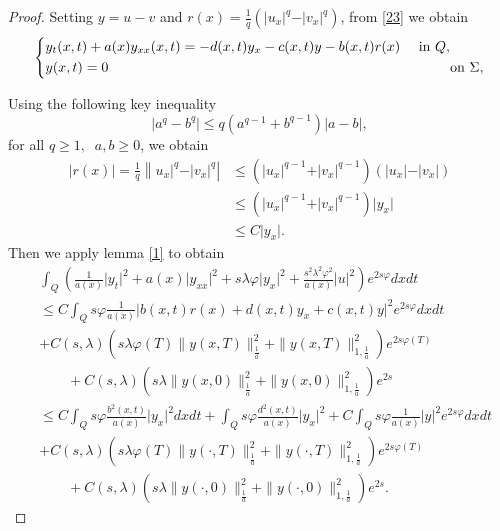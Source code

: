 \documentclass[reqno]{amsart}
\theoremstyle{plain}
\theoremstyle{remark}
\numberwithin{equation}{section}
\begin{document}
\begin{proof}
    Setting $y=u-v$ and $r(x)=\frac{1}{q}(\vert u_{x}\vert^q-\vert v_{x}\vert^q)$, from \eqref{23} we obtain
   \begin{equation}
       \left\{
\begin{aligned}
& y_{t}(x,t) +a(x) y_{xx}(x,t)=-d(x,t)y_{x}-c(x,t)y -b(x,t)r(x)\quad\text{ in } Q,\\
& y(x,t)=0 \hspace{8.5cm}\text{ on } \Sigma,
\label{hjeq1to4}
\end{aligned}
\right.
\end{equation}

 Using the following key inequality
\begin{equation}\label{kineq}
\vert a^q-b^q \vert \leqslant q \left(a^{q-1}+b^{q-1}\right) \vert a-b\vert,
\end{equation}
for all $q \geqslant 1, \;\;a,b\geqslant 0$, we obtain
\begin{align*}
    \vert r(x)\vert =\frac{1}{q}\left\| u_{x}\vert^q-\vert v_{x}\vert^q\right\vert  &\leqslant \left( \vert u_{x}\vert^{q-1}+\vert v_{x}\vert^{q-1}\right)(\vert u_{x}\vert-\vert v_{x}\vert) \\&\leqslant \left( \vert u_{x}\vert^{q-1}+\vert v_{x}\vert^{q-1}\right)\vert y_{x}\vert\\& \leqslant C\vert y_{x}\vert.
\end{align*}
Then we apply lemma \eqref{1} to obtain
\begin{align*}
    &\int_{Q} \left(\frac{1}{a(x)}\vert y_{t}\vert^2+ a(x)\vert y_{xx}\vert^2+ s\lambda \varphi  \vert y_{x}\vert^2+ \frac{s^2\lambda^2\varphi^2}{a(x)}\vert u\vert^2\right)e^{2s\varphi}dxdt\\&\leqslant C  \int_{Q}s\varphi\frac{1}{a(x)}\vert b(x,t)r(x)+ d(x,t)y_{x} + c(x,t) y\vert^2e^{2s\varphi} dxdt \\&+C( s,\lambda)\left( s\lambda\varphi(T)\| y(x,T)\|_{\frac{1}{a}}^2+\| y(x,T)\|_{1,\frac{1}{a}}^2 \right)e^{2s\varphi(T)} \\&\qquad+C(s,\lambda)\left( s\lambda\| y(x,0)\|_{\frac{1}{a}}^2+\| y(x,0)\|_{1,\frac{1}{a}}^2\right)e^{2s}\\ &\leqslant C  \int_{Q}s\varphi \frac{b^2(x,t)}{a(x)}\vert y_{x}\vert^2 dxdt + \int_{Q}s\varphi{\frac{d^2(x,t)}{a(x)}}\vert y_{x}\vert^2+ C \int_{Q}s\varphi\frac{1}{a(x)}  \vert y\vert^2e^{2s\varphi} dxdt \\&+C( s,\lambda)\left( s\lambda\varphi(T)\| y(\cdot,T)\|_{\frac{1}{a}}^2+\| y(\cdot,T)\|_{1,\frac{1}{a}}^2 \right)e^{2s\varphi(T)}\\& \qquad+C(s,\lambda)\left( s\lambda\| y(\cdot,0)\|_{\frac{1}{a}}^2+\| y(\cdot,0)\|_{1,\frac{1}{a}}^2\right)e^{2s}.

\end{align*}
\end{proof}
\end{document}
